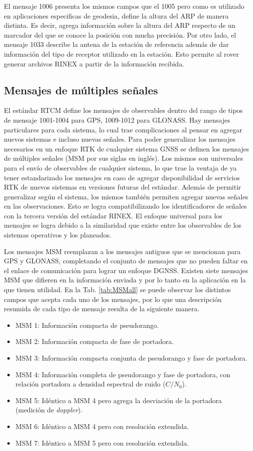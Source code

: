 \documentclass[a4paper,12pt,oneside,onecolumn,final,openright]{book}%
\begin{document}
	El mensaje 1006 presenta los mismos campos que el 1005 pero como es utilizado en aplicaciones especificas de geodesia, define la altura del ARP de manera distinta. Es decir, agrega información sobre la altura del ARP respecto de un marcador del que se conoce la posición con mucha precisión. Por otro lado, el mensaje 1033 describe la antena de la estación de referencia además de dar información del tipo de receptor utilizado en la estación. Esto permite al rover generar archivos RINEX \cite{rinex} a partir de la información recibida.
	
\subsection{Mensajes de múltiples señales}
	El estándar RTCM define los mensajes de observables dentro del rango de tipos de mensaje 1001-1004 para GPS, 1009-1012 para GLONASS. Hay mensajes particulares para cada sistema, lo cual trae complicaciones al pensar en agregar nuevos sistemas e incluso nuevas señales. Para poder generalizar los mensajes necesarios en un enfoque RTK de cualquier sistema GNSS se definen los mensajes de múltiples señales (MSM por sus siglas en inglés). Los mismos son universales para el envío de observables de cualquier sistema, lo que trae la ventaja de ya tener estandarizado los mensajes en caso de agregar disponibilidad de servicios RTK de nuevos sistemas en versiones futuras del estándar. Además de permitir generalizar según el sistema, los mismos también permiten agregar nuevas señales en las observaciones. Esto se logra compatibilizando los identificadores de señales con la tercera versión del estándar RINEX. El enfoque universal para los mensajes se logra debido a la similaridad que existe entre los observables de los sistemas operativos y los planeados.
	
	Los mensajes MSM reemplazan a los mensajes antiguos que se mencionan para GPS y GLONASS, completando el conjunto de mensajes que no pueden faltar en el enlace de comunicación para lograr un enfoque DGNSS. Existen siete mensajes MSM que difieren en la información enviada y por lo tanto en la aplicación en la que tienen utilidad. En la Tab. \ref{tab:MSMall} se puede observar los distintos campos que acepta cada uno de los mensajes, por lo que una descripción resumida de cada tipo de mensaje resulta de la siguiente manera.
\begin{itemize}
	\item MSM 1: Información compacta de pseudorango.
	\item MSM 2: Información compacta de fase de portadora.
	\item MSM 3: Información compacta conjunta de pseudorango y fase de portadora.
	\item MSM 4: Información completa de pseudorango y fase de portadora, con relación portadora a densidad espectral de ruido ($C/N_0$).
	\item MSM 5: Idéntico a MSM 4 pero agrega la desviación de la portadora (medición de \textit{doppler}).
	\item MSM 6: Idéntico a MSM 4 pero con resolución extendida.
	\item MSM 7: Idéntico a MSM 5 pero con resolución extendida.
\end{itemize}
\end{document}
